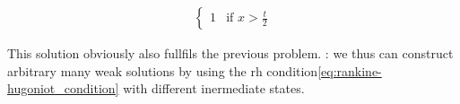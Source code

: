 \begin{examplebox}
\begin{example}
\begin{minipage}[c]{0.55\textwidth}
\begin{align}
\begin{cases}
                    1&\text{if }x>\frac{t}{2}
                    \end{cases}
            \label{eq:riemann_problem}
            \end{align}
        \end{minipage}
        \vspace{-1em}
        \begin{minipage}{0.3\textwidth}
            \begin{figure}[H]
                \centering{
                  \def\svgwidth{50pt}
                  \resizebox{0.9\linewidth}{!}{}
                }
            \end{figure}
        \end{minipage}
        \begin{minipage}{0.4\textwidth}
            \begin{figure}[H]
                \centering{
                  \def\svgwidth{70pt}
                  \resizebox{\linewidth}{!}{}
                }
            \end{figure}
        \end{minipage}\hfill
        \begin{minipage}{0.55\textwidth}
            \begin{figure}[H]
                \centering{
                  \def\svgwidth{110pt}
                  \resizebox{\linewidth}{!}{}
                }
            \end{figure}
        \end{minipage}
        This solution obviously also fullfils the previous problem.
        : we thus can construct arbitrary many weak solutions by using the rh condition\cref{eq:rankine-hugoniot_condition} with different inermediate states.
    \end{example}
\end{examplebox}

